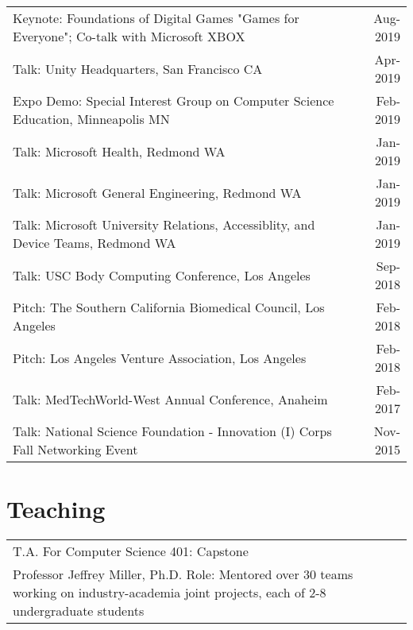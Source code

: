 \documentclass[10pt,a4paper]{article}
\begin{document}
  \vspace*{1mm}\noindent\begin{tabularx}{17cm}{X r}
    Keynote: Foundations of Digital Games "Games for Everyone"; Co-talk with Microsoft XBOX & Aug-2019 \\
    Talk: Unity Headquarters, San Francisco CA & Apr-2019\\
    Expo Demo: Special Interest Group on Computer Science Education, Minneapolis MN & Feb-2019\\ %
    Talk: Microsoft Health, Redmond WA & Jan-2019\\
    Talk: Microsoft General Engineering, Redmond WA & Jan-2019\\
    Talk: Microsoft University Relations, Accessiblity, and Device Teams, Redmond WA & Jan-2019\\
    Talk: USC Body Computing Conference, Los Angeles & Sep-2018\\ %
    Pitch: The Southern California Biomedical Council, Los Angeles & Feb-2018 \\ %
    Pitch: Los Angeles Venture Association, Los Angeles & Feb-2018 \\%
    Talk: MedTechWorld-West Annual Conference, Anaheim & Feb-2017\\ %
    Talk: National Science Foundation - Innovation (I) Corps Fall Networking Event & Nov-2015\\
  \end{tabularx}

\vspace*{2mm}\section*{Teaching}

  \vspace*{1mm}\noindent\begin{tabularx}{17cm}{X r}
    T.A. For Computer Science 401: Capstone & \multirow{3}{*}{}{Spring-2018} \\
    Professor Jeffrey Miller, Ph.D.
    Role: Mentored over 30 teams working on industry-academia joint projects, each of 2-8 undergraduate students\\[2mm]
\end{tabularx}
\end{document}
